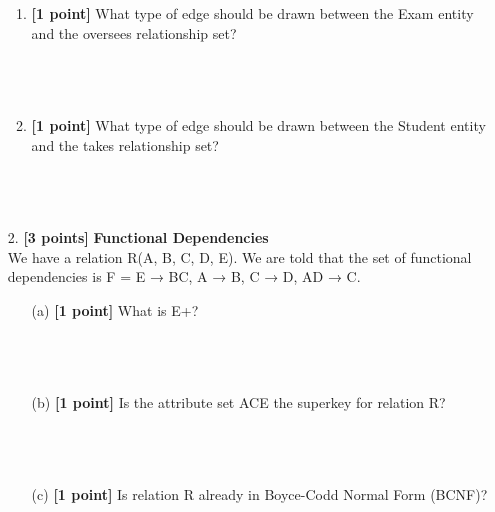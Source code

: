 \documentclass[10pt]{article}
\begin{document}
\begin{enumerate}
\begin{enumerate}
            \item\textbf{[1 point]} What type of edge should be drawn between the Exam entity and the oversees relationship set? \\ \\ \\ \\
            \item\textbf{[1 point]} What type of edge should be drawn between the Student entity and the takes relationship set? \\ \\ \\ \\
        \end{enumerate}

    \item[2.]  \textbf{[3 points]} \textbf{Functional Dependencies} \\
        We have a relation R(A, B, C, D, E). We are told that the set of functional dependencies is
        F = {E → BC, A → B, C → D, AD → C}.
        \begin{itemize}
            \item[(a)] \textbf{[1 point]} What is E+? \\ \\ \\ \\
            \item[(b)] \textbf{[1 point]} Is the attribute set ACE the superkey for relation R? \\ \\ \\ \\
            \item[(c)] \textbf{[1 point]} Is relation R already in Boyce-Codd Normal Form (BCNF)? \\ \\ \\ \\
        \end{itemize}


\end{enumerate}
\end{document}
